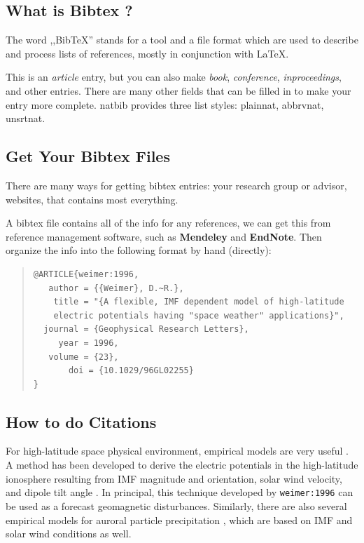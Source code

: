 \documentclass[12pt, letterpaper]{article} %
\begin{document}
\subsection{What is Bibtex ?} %
The word ,,BibTeX'' stands for a tool and a file format which are used to describe 
and process lists of references, mostly in conjunction with \LaTeX.

This is an {\it article} entry, but you can also make {\it book}, 
{\it conference}, {\it inproceedings}, and other entries.  There are many other
fields that can be filled in to make your entry more complete.  natbib provides 
three list styles: plainnat, abbrvnat, unsrtnat.

\subsection{Get Your Bibtex Files} %
There are many ways for getting bibtex entries: your research 
group or advisor, websites, that contains most everything.  

A bibtex file contains all of the info for any references, 
we can get this from reference management software, 
such as \textbf{Mendeley} and \textbf{EndNote}. Then 
organize the info into the following format by hand (directly):

\begin{quote} %
\begin{verbatim} 
@ARTICLE{weimer:1996,
   author = {{Weimer}, D.~R.},
    title = "{A flexible, IMF dependent model of high-latitude 
    electric potentials having "space weather" applications}",
  journal = {Geophysical Research Letters},
     year = 1996,
   volume = {23},
       doi = {10.1029/96GL02255}
}
\end{verbatim} %
\end{quote} %

\subsection{How to do Citations} %
For high-latitude space physical environment, empirical models are very useful  
\citet{weimer:1996}. A method has been developed to derive the electric potentials 
in the high-latitude ionosphere resulting from IMF magnitude and orientation, solar 
wind velocity, and dipole tilt angle \citep[chap. 2]{weimer:1996}. In principal, this 
technique developed by {\tt weimer:1996} can be used as a forecast geomagnetic 
disturbances. Similarly, there are also several empirical models for auroral particle 
precipitation \cite[]{hardy:1989,Fuller-Rowell1987}, which are based on IMF and 
solar wind conditions as well. 
\end{document}
